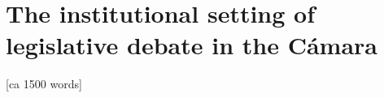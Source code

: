 \documentclass[letter,12pt]{article}
\begin{document}
\section{The institutional setting of legislative debate in the Cámara} [ca 1500 words]



\end{document}
